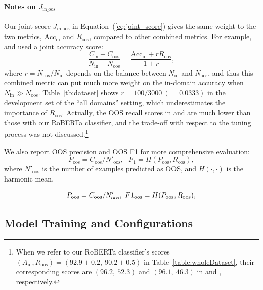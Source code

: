 \paragraph{Notes on $J_\mathrm{in\_oos}$}
Our joint score $J_\mathrm{in\_oos}$ in Equation~(\ref{eq:joint_score}) gives the same weight to the two metrics, $\mathrm{Acc}_\mathrm{in}$ and $R_\mathrm{oos}$, compared to other combined metrics.
For example, \citet{oos-intent} and \citet{tod-bert} used a joint accuracy score: 
\begin{equation}
\frac{C_\mathrm{in}+C_\mathrm{oos}}{N_\mathrm{in}+N_\mathrm{oos}} = \frac{\mathrm{Acc}_\mathrm{in} + r R_\mathrm{oos}}{1 + r},
\end{equation}
where $r=N_\mathrm{oos}/N_\mathrm{in}$ depends on the balance between $N_\mathrm{in}$ and $N_\mathrm{oos}$, and thus this combined metric can put much more weight on the in-domain accuracy when $N_\mathrm{in} \gg N_\mathrm{oos}$.
Table~\ref{tb:dataset} shows $r=100/3000~(=0.0333)$ in the development set of the ``all domains'' setting, which underestimates the importance of $R_\mathrm{oos}$.
Actually, the OOS recall scores in \citet{oos-intent} and \citet{tod-bert} are much lower than those with our RoBERTa classifier, and the trade-off with respect to the tuning process was not discussed.\footnote{When we refer to our RoBERTa classifier's scores $(A_\mathrm{in}, R_\mathrm{oos})=(92.9\pm0.2,~90.2\pm0.5)$ in Table~\ref{table:wholeDataset}, their corresponding scores are $(96.2,~52.3)$ and $(96.1,~46.3)$ in \citet{oos-intent} and \citet{tod-bert}, respectively.}



We also report OOS precision and OOS F1 for more comprehensive evaluation:
\begin{equation}
    P_\mathrm{oos} = C_\mathrm{oos}/N'_\mathrm{oos}, ~~~ F_1 = H(P_\mathrm{oos}, R_\mathrm{oos}),
\end{equation}
where $N'_\mathrm{oos}$ is the number of examples predicted as OOS, and $H(\cdot, \cdot)$ is the harmonic mean.

\begin{equation}
    \hspace{-0.5mm}
    P_\mathrm{oos} = C_\mathrm{oos}/N'_\mathrm{oos}, ~ F1_\mathrm{oos} = H(P_\mathrm{oos}, R_\mathrm{oos}),
\end{equation}
\fi


\subsection{Model Training and Configurations}
\label{subsec:model_setting}

